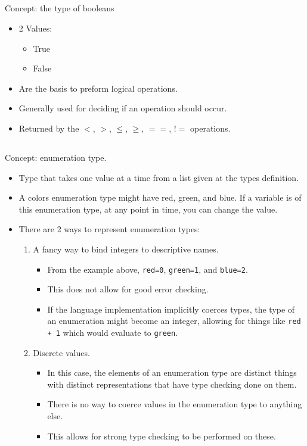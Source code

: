 \subsection{}
Concept: the type of booleans

\begin{itemize}
\item 2 Values:
  \begin{itemize}[noitemsep]
  \item True
  \item False
  \end{itemize}

\item Are the basis to preform logical operations.
\item Generally used for deciding if an operation should occur.
\item Returned by the $<$, $>$, $\leq$, $\geq$, $==$, $!=$ operations.
\end{itemize}

\subsection{}
Concept: enumeration type.

\begin{itemize}
\item Type that takes one value at a time from a list given at the types definition.
\item A colors enumeration type might have red, green, and blue. If a variable is of this enumeration type, at any point in time, you can change the value.
\item There are 2 ways to represent enumeration types:
  \begin{enumerate}[noitemsep]
  \item A fancy way to bind integers to descriptive names.
    \begin{itemize}[noitemsep]
    \item From the example above, \texttt{red=0}, \texttt{green=1}, and \texttt{blue=2}.
    \item This does not allow for good error checking.
    \item If the language implementation implicitly coerces types, the type of an enumeration might become an integer, allowing for things like \texttt{red + 1} which would evaluate to \texttt{green}.
    \end{itemize}
  \item Discrete values.
    \begin{itemize}[noitemsep]
    \item In this case, the elements of an enumeration type are distinct things with distinct representations that have type checking done on them.
    \item There is no way to coerce values in the enumeration type to anything else.
    \item This allows for strong type checking to be performed on these.
    \end{itemize}
  \end{enumerate}
\end{itemize}


